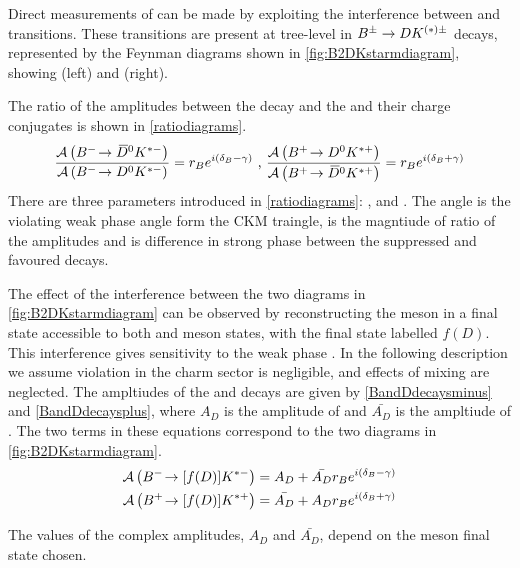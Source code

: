 Direct measurements of \Pgamma can be made by exploiting the interference between \decay{\bquark}{\cquark\uquarkbar\squark} and \decay{\bquark}{\uquark\cquarkbar\squark} transitions. These transitions are present at tree-level in ${{B}^\pm} \rightarrow {\ensuremath{D}}{\ensuremath{K}}^{(*)\pm}$ decays, represented by the Feynman diagrams shown in \fig\ref{fig:B2DKstarmdiagram}, showing \decay{\Bm}{\Dz\Kstarm} (left) and \decay{\Bm}{\Dzb\Kstarm} (right). 

The ratio of the amplitudes between the \decay{\Bm}{\Dzb\Kstarm} decay and the \decay{\Bm}{\Dz\Kstarm} and their charge conjugates is shown in \eqn\ref{ratiodiagrams}.
\begin{equation}
\frac{\mathcal{A}\left({{{B}^-}}\!\rightarrow {\ensuremath{{\kern 0.2em\overline{\kern -0.2em D}{}}{}^0}}{\ensuremath{{K}^{*-}}}\right)}{\mathcal{A}\left({{{B}^-}}\!\rightarrow {\ensuremath{{D}^0}}{\ensuremath{{K}^{*-}}}\right)} = r_B e^{i(\delta_B - \gamma)} \text{ , }
\frac{\mathcal{A}\left({{{B}^+}}\!\rightarrow {\ensuremath{{D}^0}}{\ensuremath{{K}^{*+}}}\right)}{\mathcal{A}\left({{{B}^+}}\!\rightarrow {\ensuremath{{\kern 0.2em\overline{\kern -0.2em D}{}}{}^0}}{\ensuremath{{K}^{*+}}}\right)} = r_B e^{i(\delta_B + \gamma)}
\label{ratiodiagrams}
\end{equation}
There are three parameters introduced in \eqn\ref{ratiodiagrams}: \rb, \deltab and \Pgamma. The angle \Pgamma is the \CP violating weak phase angle form the CKM traingle, \rb is the magntiude of ratio of the amplitudes and \deltab is difference in strong phase between the suppressed and favoured decays.

The effect of the interference between the two diagrams in \fig\ref{fig:B2DKstarmdiagram} can be observed by reconstructing the \D meson in a final state accessible to both \Dz and \Dzb meson states, with the final state labelled $f(D)$. This interference gives sensitivity to the weak phase \Pgamma. In the following description we assume \CP violation in the charm sector is negligible, and effects of \D mixing are neglected. The ampltiudes of the \Bm and \Bp decays are given by \eqn\ref{BandDdecaysminus} and \ref{BandDdecaysplus}, where $A_D$ is the amplitude of  and $\bar{A_{D}}$ is the ampltiude of . The two terms in these equations correspond to the two diagrams in \fig\ref{fig:B2DKstarmdiagram}.
\begin{align}
\mathcal{A}\left({{{B}^-}}\!\rightarrow [f(D)]{\ensuremath{{K}^{*-}}}\right) &= A_{D} + \bar{A_{D}}r_B e^{i(\delta_B - \gamma)} \label{BandDdecaysminus} \\
\mathcal{A}\left({{{B}^+}}\!\rightarrow [f(D)]{\ensuremath{{K}^{*+}}}\right) &= \bar{A_{D}} + A_{D}r_B e^{i(\delta_B + \gamma)} \label{BandDdecaysplus}
\end{align}

The values of the complex amplitudes, $A_{D}$ and $\bar{A_{D}}$, depend on the \D meson final state chosen.


